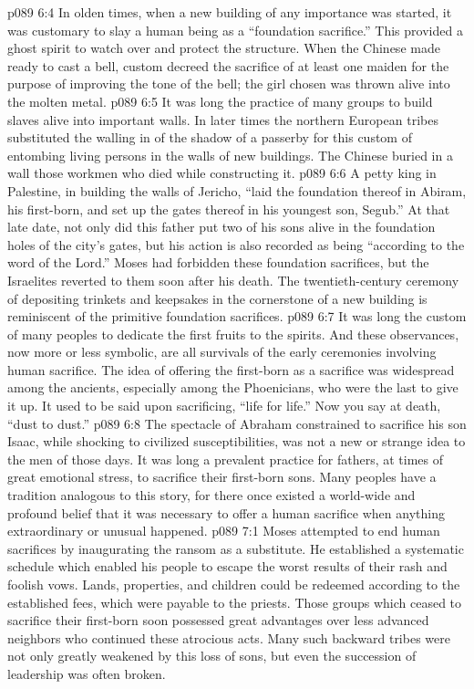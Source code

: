 \vs p089 6:4 \pc In olden times, when a new building of any importance was started, it was customary to slay a human being as a “foundation sacrifice.” This provided a ghost spirit to watch over and protect the structure. When the Chinese made ready to cast a bell, custom decreed the sacrifice of at least one maiden for the purpose of improving the tone of the bell; the girl chosen was thrown alive into the molten metal.
\vs p089 6:5 It was long the practice of many groups to build slaves alive into important walls. In later times the northern European tribes substituted the walling in of the shadow of a passerby for this custom of entombing living persons in the walls of new buildings. The Chinese buried in a wall those workmen who died while constructing it.
\vs p089 6:6 A petty king in Palestine, in building the walls of Jericho, “laid the foundation thereof in Abiram, his first\hyp{}born, and set up the gates thereof in his youngest son, Segub.” At that late date, not only did this father put two of his sons alive in the foundation holes of the city’s gates, but his action is also recorded as being “according to the word of the Lord.” Moses had forbidden these foundation sacrifices, but the Israelites reverted to them soon after his death. The twentieth\hyp{}century ceremony of depositing trinkets and keepsakes in the cornerstone of a new building is reminiscent of the primitive foundation sacrifices.
\vs p089 6:7 \pc It was long the custom of many peoples to dedicate the first fruits to the spirits. And these observances, now more or less symbolic, are all survivals of the early ceremonies involving human sacrifice. The idea of offering the first\hyp{}born as a sacrifice was widespread among the ancients, especially among the Phoenicians, who were the last to give it up. It used to be said upon sacrificing, “life for life.” Now you say at death, “dust to dust.”
\vs p089 6:8 The spectacle of Abraham constrained to sacrifice his son Isaac, while shocking to civilized susceptibilities, was not a new or strange idea to the men of those days. It was long a prevalent practice for fathers, at times of great emotional stress, to sacrifice their first\hyp{}born sons. Many peoples have a tradition analogous to this story, for there once existed a world\hyp{}wide and profound belief that it was necessary to offer a human sacrifice when anything extraordinary or unusual happened.
\vs p089 7:1 Moses attempted to end human sacrifices by inaugurating the ransom as a substitute. He established a systematic schedule which enabled his people to escape the worst results of their rash and foolish vows. Lands, properties, and children could be redeemed according to the established fees, which were payable to the priests. Those groups which ceased to sacrifice their first\hyp{}born soon possessed great advantages over less advanced neighbors who continued these atrocious acts. Many such backward tribes were not only greatly weakened by this loss of sons, but even the succession of leadership was often broken.
